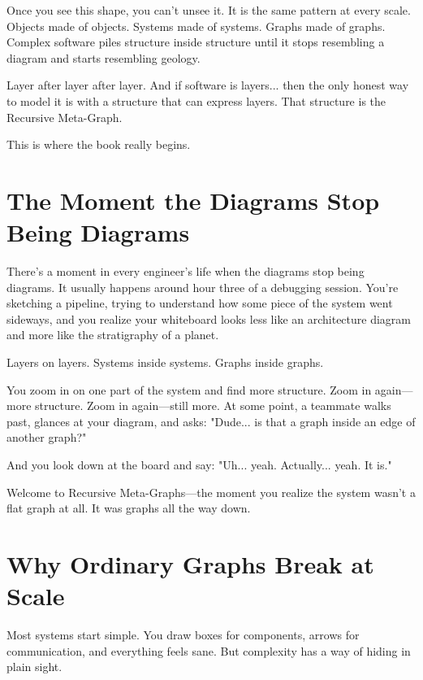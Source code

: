 Once you see this shape, you can't unsee it. It is the same pattern at every scale. Objects made of objects. Systems made of systems. Graphs made of graphs. Complex software piles structure inside structure until it stops resembling a diagram and starts resembling geology.

Layer after layer after layer. And if software is layers... then the only honest way to model it is with a structure that can express layers. That structure is the Recursive Meta-Graph.

This is where the book really begins.

\section{The Moment the Diagrams Stop Being Diagrams}
\label{sec:diagrams-stop}

There's a moment in every engineer's life when the diagrams stop being diagrams. It usually happens around hour three of a debugging session. You're sketching a pipeline, trying to understand how some piece of the system went sideways, and you realize your whiteboard looks less like an architecture diagram and more like the stratigraphy of a planet.

Layers on layers. Systems inside systems. Graphs inside graphs.

You zoom in on one part of the system and find more structure. Zoom in again—more structure. Zoom in again—still more. At some point, a teammate walks past, glances at your diagram, and asks: "Dude... is that a graph inside an edge of another graph?"

And you look down at the board and say: "Uh... yeah. Actually... yeah. It is."

Welcome to Recursive Meta-Graphs—the moment you realize the system wasn't a flat graph at all. It was graphs all the way down.

\section{Why Ordinary Graphs Break at Scale}
\label{sec:graphs-break}

Most systems start simple. You draw boxes for components, arrows for communication, and everything feels sane. But complexity has a way of hiding in plain sight.

